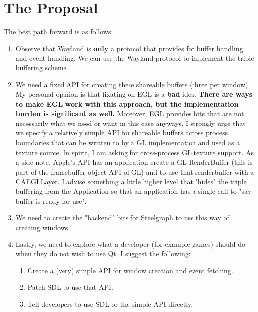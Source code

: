 \documentclass[a4paper,11pt]{article}
\begin{document}
\section{The Proposal}
\begin{indenter}{2cm}

The best path forward is as follows:

\begin{enumerate}
\item Observe that Wayland is \textbf{only} a protocol that provides for buffer
handling and event handling. We can use the Wayland protocol to implement
the triple buffering scheme.
\item We need a fixed API for creating these shareable buffers (three per window).
My personal opinion is that fixating on EGL is a \textbf{bad} idea. \textbf{There are ways
to make EGL work with this approach, but the implementation burden is significant
as well.} Moreover, EGL provides bits that are not necessarily what we need
or want in this case anyways. I strongly urge that we specify a relatively
simple API for shareable buffers across process boundaries that can be written
to by a GL implementation and used as a texture source. In spirit, I am asking
for cross-process GL texture support. As a side note, Apple's API has an
application create a GL RenderBuffer (this is part of the framebuffer object
API of GL) and to use that renderbuffer with a CAEGLLayer. I advise something
a little higher level that "hides" the triple buffering from the Application
so that an application has a single call to "say buffer is ready for use".
\item We need to create the "backend" bits for Steelgraph to use
this way of creating windows.
\item Lastly, we need to explore what a developer (for example games) should do
when they do not wish to use Qt. I suggest the following:
    \begin{enumerate}
    \item Create a (very) simple API for window creation and event fetching.
    \item Patch SDL to use that API.
    \item Tell developers to use SDL or the simple API directly.
    \end{enumerate}
\end{enumerate}

\end{indenter}
\end{document}
